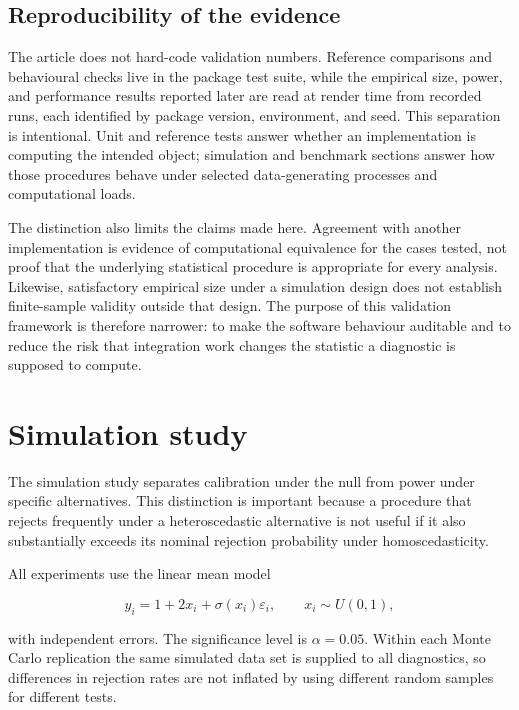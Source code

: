 \subsection{Reproducibility of the evidence}\label{reproducibility-of-the-evidence}

The article does not hard-code validation numbers. Reference comparisons and
behavioural checks live in the package test suite, while the empirical size,
power, and performance results reported later are read at render time from
recorded runs, each identified by package version, environment, and seed. This
separation is intentional. Unit and reference tests answer whether an
implementation is computing the intended object; simulation and benchmark
sections answer how those procedures behave under selected data-generating
processes and computational loads.

The distinction also limits the claims made here. Agreement with another
implementation is evidence of computational equivalence for the cases tested,
not proof that the underlying statistical procedure is appropriate for every
analysis. Likewise, satisfactory empirical size under a simulation design does
not establish finite-sample validity outside that design. The purpose of this
validation framework is therefore narrower: to make the software behaviour
auditable and to reduce the risk that integration work changes the statistic a
diagnostic is supposed to compute.

\section{Simulation study}\label{simulation-study}

The simulation study separates calibration under the null from power under
specific alternatives. This distinction is important because a procedure that
rejects frequently under a heteroscedastic alternative is not useful if it also
substantially exceeds its nominal rejection probability under homoscedasticity.

All experiments use the linear mean model

\[
  y_i = 1 + 2x_i + \sigma(x_i)\varepsilon_i,
  \qquad x_i \sim U(0,1),
\]

with independent errors. The significance level is \(\alpha=0.05\). Within
each Monte Carlo replication the same simulated data set is supplied to all
diagnostics, so differences in rejection rates are not inflated by using
different random samples for different tests.

